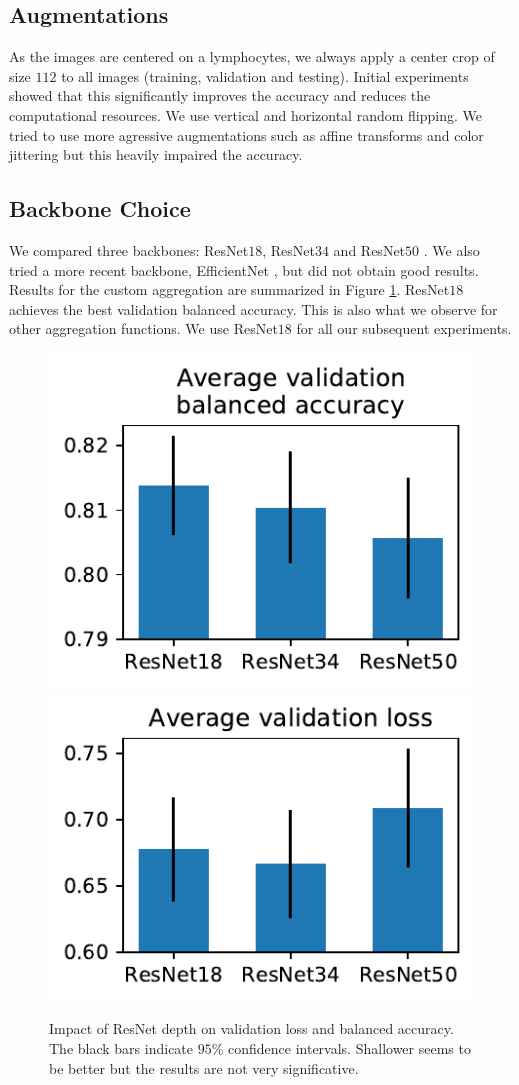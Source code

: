 \documentclass[final]{cvpr}
\begin{document}
	\subsection{Augmentations}
	
	As the images are centered on a lymphocytes, we always apply a center crop of size $112$ to all images (training, validation and testing). Initial experiments showed that this significantly improves the accuracy and reduces the computational resources. We use vertical and horizontal random flipping. We tried to use more agressive augmentations such as affine transforms and color jittering but this heavily impaired the accuracy.

	\subsection{Backbone Choice}
	
	We compared three backbones: ResNet$18$, ResNet$34$ and ResNet$50$ \cite{resnet}. We also tried a more recent backbone, EfficientNet \cite{efn}, but did not obtain good results. Results for the custom aggregation are summarized in Figure \ref{fig:resnet}. ResNet$18$ achieves the best validation balanced accuracy. This is also what we observe for other aggregation functions. We use ResNet$18$ for all our subsequent experiments.
	
	\begin{figure}[h]
		\begin{center}
			\includegraphics[width=0.47\linewidth]{fig/resnets_bal_acc.pdf}
			\includegraphics[width=0.47\linewidth]{fig/resnets_val_loss.pdf}
		\end{center}
		\caption{Impact of ResNet depth on validation loss and balanced accuracy. The black bars indicate $95\%$ confidence intervals. Shallower seems to be better but the results are not very significative.}
		\label{fig:resnet}
	\end{figure}
\end{document}
